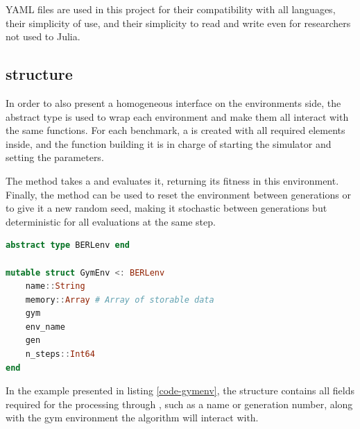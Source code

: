 YAML files are used in this project for their compatibility with all languages, their simplicity of use, and their simplicity to read and write even for researchers not used to Julia. 


\subsection{ structure}

In order to also present a homogeneous interface on the environments side, the  abstract type is used to wrap each environment and make them all interact with the same functions. For each benchmark, a  is created with all required elements inside, and the function building it is in charge of starting the simulator and setting the parameters.

The  method takes a  and evaluates it, returning its fitness in this environment. Finally, the  method can be used to reset the environment between generations or to give it a new random seed, making it stochastic between generations but deterministic for all evaluations at the same step.

\begin{minipage}{\linewidth}
\begin{lstlisting}[language=Julia, caption=Gym wrapper in \berl, label=code-gymenv]
abstract type BERLenv end

mutable struct GymEnv <: BERLenv
    name::String
    memory::Array # Array of storable data
    gym
    env_name
    gen
    n_steps::Int64
end
\end{lstlisting}
\end{minipage}

In the example presented in listing \ref{code-gymenv}, the  structure contains all fields required for the processing through \berl, such as a name or generation number, along with the gym environment the algorithm will interact with. 

\subsection{}

